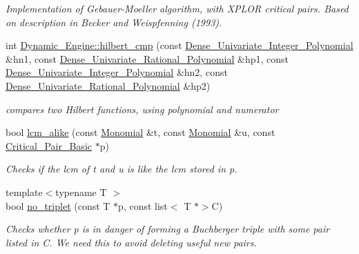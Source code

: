 \begin{DoxyCompactItemize}
\begin{DoxyCompactList}\small\item\em Implementation of Gebauer-\/\+Moeller algorithm, with X\+P\+L\+OR critical pairs. Based on description in Becker and Weispfenning (1993). \end{DoxyCompactList}\item 
int \hyperlink{group___g_b_computation_ga9be1af3b4560bec7a8f17c5716e33ee7}{Dynamic\+\_\+\+Engine\+::hilbert\+\_\+cmp} (const \hyperlink{group__polygroup_class_dense___univariate___integer___polynomial}{Dense\+\_\+\+Univariate\+\_\+\+Integer\+\_\+\+Polynomial} \&hn1, const \hyperlink{group__polygroup_class_dense___univariate___rational___polynomial}{Dense\+\_\+\+Univariate\+\_\+\+Rational\+\_\+\+Polynomial} \&hp1, const \hyperlink{group__polygroup_class_dense___univariate___integer___polynomial}{Dense\+\_\+\+Univariate\+\_\+\+Integer\+\_\+\+Polynomial} \&hn2, const \hyperlink{group__polygroup_class_dense___univariate___rational___polynomial}{Dense\+\_\+\+Univariate\+\_\+\+Rational\+\_\+\+Polynomial} \&hp2)
\begin{DoxyCompactList}\small\item\em compares two Hilbert functions, using polynomial and numerator \end{DoxyCompactList}\item 
bool \hyperlink{group___g_b_computation_gaa94e7defe45b81c6e80138df0637c0dd}{lcm\+\_\+alike} (const \hyperlink{group__polygroup_class_monomial}{Monomial} \&t, const \hyperlink{group__polygroup_class_monomial}{Monomial} \&u, const \hyperlink{group___g_b_computation_class_critical___pair___basic}{Critical\+\_\+\+Pair\+\_\+\+Basic} $\ast$p)
\begin{DoxyCompactList}\small\item\em Checks if the lcm of {\ttfamily t} and {\ttfamily u} is like the lcm stored in {\ttfamily p}. \end{DoxyCompactList}\item 
{\footnotesize template$<$typename T $>$ }\\bool \hyperlink{group___g_b_computation_ga8ea11a89240d420c46bcad752aeb0f6a}{no\+\_\+triplet} (const T $\ast$p, const list$<$ T $\ast$$>$C)
\begin{DoxyCompactList}\small\item\em Checks whether {\ttfamily p} is in danger of forming a Buchberger triple with some pair listed in {\ttfamily C}. We need this to avoid deleting useful new pairs. \end{DoxyCompactList}\item 
$$
\end{DoxyCompactItemize}
